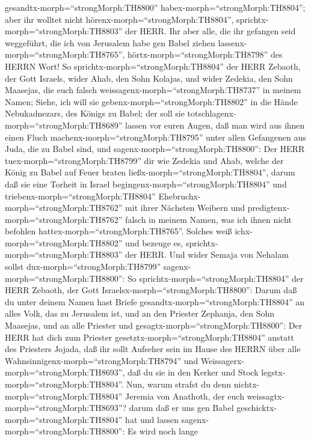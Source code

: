 gesandtx-morph=``strongMorph:TH8800''
habex-morph=``strongMorph:TH8804''; aber ihr wolltet nicht
hörenx-morph=``strongMorph:TH8804'',
sprichtx-morph=``strongMorph:TH8803'' der HERR.  Ihr aber
alle, die ihr gefangen seid weggeführt, die ich von Jerusalem habe gen
Babel ziehen lassenx-morph=``strongMorph:TH8765'',
hörtx-morph=``strongMorph:TH8798'' des HERRN Wort!  So
sprichtx-morph=``strongMorph:TH8804'' der HERR Zebaoth, der Gott
Israels, wider Ahab, den Sohn Kolajas, und wider Zedekia, den Sohn
Maasejas, die euch falsch weissagenx-morph=``strongMorph:TH8737'' in
meinem Namen; Siehe, ich will sie gebenx-morph=``strongMorph:TH8802'' in
die Hände Nebukadnezars, des Königs zu Babel; der soll sie
totschlagenx-morph=``strongMorph:TH8689'' lassen vor euren Augen,
 daß man wird aus ihnen einen Fluch
machenx-morph=``strongMorph:TH8795'' unter allen Gefangenen aus Juda,
die zu Babel sind, und sagenx-morph=``strongMorph:TH8800'': Der HERR
tuex-morph=``strongMorph:TH8799'' dir wie Zedekia und Ahab, welche der
König zu Babel auf Feuer braten ließx-morph=``strongMorph:TH8804'',
 darum daß sie eine Torheit in Israel
begingenx-morph=``strongMorph:TH8804'' und
triebenx-morph=``strongMorph:TH8804''
Ehebruchx-morph=``strongMorph:TH8762'' mit ihrer Nächsten Weibern und
predigtenx-morph=``strongMorph:TH8762'' falsch in meinem Namen, was ich
ihnen nicht befohlen hattex-morph=``strongMorph:TH8765''. Solches weiß
ichx-morph=``strongMorph:TH8802'' und bezeuge es,
sprichtx-morph=``strongMorph:TH8803'' der HERR.  Und wider
Semaja von Nehalam sollst dux-morph=``strongMorph:TH8799''
sagenx-morph=``strongMorph:TH8800'':  So
sprichtx-morph=``strongMorph:TH8804'' der HERR Zebaoth, der Gott
Israelsx-morph=``strongMorph:TH8800'': Darum daß du unter deinem Namen
hast Briefe gesandtx-morph=``strongMorph:TH8804'' an alles Volk, das zu
Jerusalem ist, und an den Priester Zephanja, den Sohn Maasejas, und an
alle Priester und gesagtx-morph=``strongMorph:TH8800'': 
Der HERR hat dich zum Priester gesetztx-morph=``strongMorph:TH8804''
anstatt des Priesters Jojada, daß ihr sollt Aufseher sein im Hause des
HERRN über alle Wahnsinnigenx-morph=``strongMorph:TH8794'' und
Weissagerx-morph=``strongMorph:TH8693'', daß du sie in den Kerker und
Stock legstx-morph=``strongMorph:TH8804''.  Nun, warum
strafst du denn nichtx-morph=``strongMorph:TH8804'' Jeremia von
Anathoth, der euch weissagtx-morph=``strongMorph:TH8693''? 
darum daß er uns gen Babel geschicktx-morph=``strongMorph:TH8804'' hat
und lassen sagenx-morph=``strongMorph:TH8800'': Es wird noch lange
